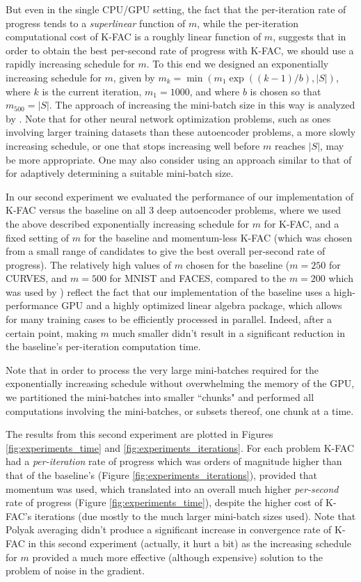 \documentclass[12pt]{article}
\newcommand{\acronym}{K-FAC}
\begin{document}
But even in the single CPU/GPU setting, the fact that the per-iteration rate of progress tends to a \emph{superlinear} function of $m$, while the per-iteration computational cost of \acronym{} is a roughly linear function of $m$, suggests that in order to obtain the best per-second rate of progress with \acronym{}, we should use a rapidly increasing schedule for $m$.   To this end we designed an exponentially increasing schedule for $m$, given by $m_k = \min( m_1 \exp( (k-1)/b ), |S| )$, where $k$ is the current iteration, $m_1 = 1000$, and where $b$ is chosen so that $m_{500} = |S|$.  The approach of increasing the mini-batch size in this way is analyzed by \citet{FriedlanderSchmidt}.  Note that for other neural network optimization problems, such as ones involving larger training datasets than these autoencoder problems, a more slowly increasing schedule, or one that stops increasing well before $m$ reaches $|S|$, may be more appropriate.  One may also consider using an approach similar to that of \citet{byrd2012sample} for adaptively determining a suitable mini-batch size.

In our second experiment we evaluated the performance of our implementation of \acronym{} versus the baseline on all 3 deep autoencoder problems, where we used the above described exponentially increasing schedule for $m$ for \acronym{}, and a fixed setting of $m$ for the baseline and momentum-less \acronym{} (which was chosen from a small range of candidates to give the best overall per-second rate of progress).  The relatively high values of $m$ chosen for the baseline ($m = 250$ for CURVES, and $m = 500$ for MNIST and FACES, compared to the $m = 200$ which was used by \citet{momentum_ilya}) reflect the fact that our implementation of the baseline uses a high-performance GPU and a highly optimized linear algebra package, which allows for many training cases to be efficiently processed in parallel.  Indeed, after a certain point, making $m$ much smaller didn't result in a significant reduction in the baseline's per-iteration computation time.

Note that in order to process the very large mini-batches required for the exponentially increasing schedule without overwhelming the memory of the GPU, we partitioned the mini-batches into smaller ``chunks" and performed all computations involving the mini-batches, or subsets thereof, one chunk at a time.

The results from this second experiment are plotted in Figures \ref{fig:experiments_time} and \ref{fig:experiments_iterations}.  For each problem \acronym{} had a \emph{per-iteration} rate of progress which was orders of magnitude higher than that of the baseline's (Figure \ref{fig:experiments_iterations}), provided that momentum was used, which translated into an overall much higher \emph{per-second} rate of progress (Figure \ref{fig:experiments_time}), despite the higher cost of \acronym{}'s iterations (due mostly to the much larger mini-batch sizes used).  Note that Polyak averaging didn't produce a significant increase in convergence rate of \acronym{} in this second experiment (actually, it hurt a bit) as the increasing schedule for $m$ provided a much more effective (although expensive) solution to the problem of noise in the gradient.
\end{document}

